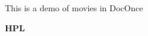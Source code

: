 \documentclass[%
oneside,                 %
final,                   %
10pt]{article}
\begin{document}
\newcommand{\exercisesection}[1]{\subsection*{#1}}


\thispagestyle{empty}
\begin{center}
{\LARGE\bf
\begin{spacing}{1.25}
This is a demo of movies in DocOnce
\end{spacing}
}
\end{center}
\begin{center}
{\bf HPL${}^{}$} \\ [0mm]
\end{center}
\begin{center}
\end{center}
    
\end{document}
